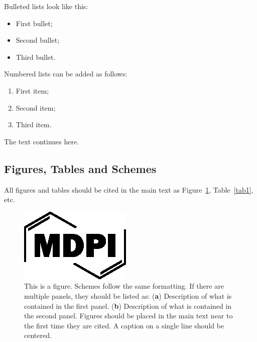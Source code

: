 \documentclass[journal,article,submit,moreauthors,pdftex]{Definitions/mdpi}
\begin{document}
\begin{paracol}{2}
    Bulleted lists look like this:
    \begin{itemize}
        \item   First bullet;
        \item   Second bullet;
        \item   Third bullet.
    \end{itemize}
    
    Numbered lists can be added as follows:
    \begin{enumerate}
        \item   First item; 
        \item   Second item;
        \item   Third item.
    \end{enumerate}
    
    The text continues here. 
    
    \subsection{Figures, Tables and Schemes}
    
    All figures and tables should be cited in the main text as Figure~\ref{fig1}, Table~\ref{tab1}, etc.
    
    \begin{figure}[H]
        \includegraphics[width=10.5 cm]{Definitions/logo-mdpi}
        \caption{This is a figure. Schemes follow the same formatting. If there are multiple panels, they should be listed as: (\textbf{a}) Description of what is contained in the first panel. (\textbf{b}) Description of what is contained in the second panel. Figures should be placed in the main text near to the first time they are cited. A caption on a single line should be centered.\label{fig1}}
    \end{figure}   
    

\end{paracol}
\end{document}

